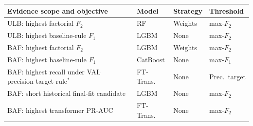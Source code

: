 \begin{tabularx}{\linewidth}{@{}X l l l@{}}
\toprule
Evidence scope and objective & Model & Strategy & Threshold \\
\midrule
ULB: highest factorial $F_2$ & RF & Weights & max-$F_2$ \\
ULB: highest baseline-rule $F_1$ & LGBM & None & max-$F_2$ \\
BAF: highest factorial $F_2$ & LGBM & Weights & max-$F_2$ \\
BAF: highest baseline-rule $F_1$ & CatBoost & None & max-$F_1$ \\
BAF: highest recall under VAL precision-target rule$^*$ & FT-Trans. & None & Prec.\ target \\
BAF: short historical final-fit candidate & LGBM & None & max-$F_2$ \\
BAF: highest transformer PR-AUC & FT-Trans. & None & max-$F_2$ \\
\bottomrule
\end{tabularx}
